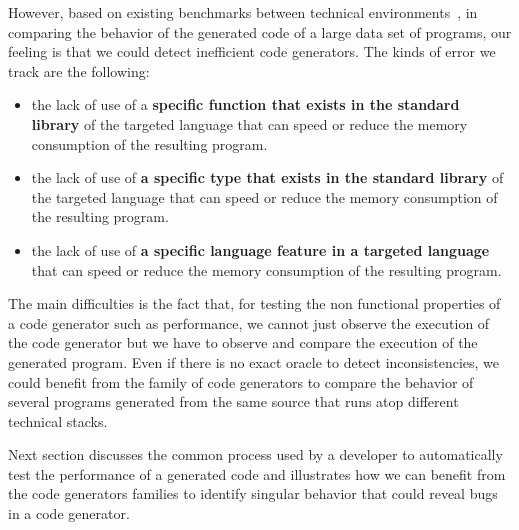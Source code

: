 However, based on existing benchmarks between technical environments~\cite{hundt2011loop}, in comparing the behavior of the generated code of a large data set of programs, our feeling is that we could detect inefficient code generators. The kinds of error we track are the following:
\begin{itemize}
	\setlength\itemsep{0em}
	\item  the lack of use of a \textbf{specific function that exists in the standard library} of the targeted language  that can speed or reduce the memory consumption of the resulting program.
	\item the lack of use of \textbf{a specific type that exists in the standard library} of the targeted language  that can speed or reduce the memory consumption of the resulting program.
	\item  the lack of use of\textbf{ a specific language feature in a targeted language}  that can speed or reduce the memory consumption of the resulting program. 
\end{itemize}

The main difficulties is the fact that, for testing the non functional properties of a code generator such as performance, we cannot just observe the execution of the code generator but we have to observe and compare the execution of the generated program. Even if there is no exact oracle to detect inconsistencies, we could benefit from the family of code generators to compare the behavior of several programs generated from the same source that runs atop different technical stacks. 

Next section discusses the common process used by a developer to automatically test the performance of a generated code and illustrates how we can benefit from the code generators families to identify singular behavior that could reveal bugs in a code generator. 





 



